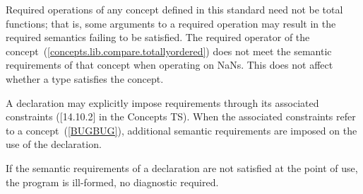 {\color{newclr}
\pnum
Required operations of any concept defined in this standard need not be
total functions; that is, some arguments to a required operation may
result in the required semantics failing to be satisfied. \enterexample
The required \tcode{<} operator of the 
concept~(\ref{concepts.lib.compare.totallyordered}) does not meet the
semantic requirements of that concept when operating on NaNs.\exitexample
This does not affect whether a type satisfies the concept.

\pnum
A declaration may explicitly impose requirements through its associated
constraints ([14.10.2] in the Concepts TS). When the associated constraints
refer to a concept~(\ref{BUGBUG}), additional semantic requirements are
imposed on the use of the declaration.

\pnum
If the semantic requirements of a declaration are not satisfied at the
point of use, the program is ill-formed, no diagnostic required.
}
